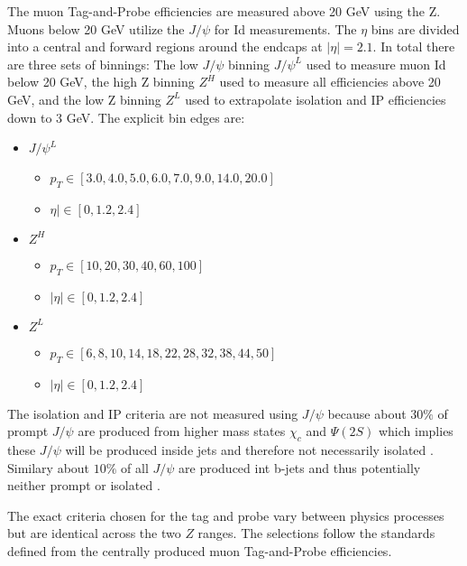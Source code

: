 The muon Tag-and-Probe efficiencies are measured above 20 GeV using the Z. Muons below 20 GeV utilize the $J/\psi$ for Id measurements. The $\eta$ bins are divided into a central and forward regions around the endcaps at $|\eta| = 2.1$. In total there are three sets of binnings: The low \pt $J/\psi$ binning $J/\psi^{L}$ used to measure muon Id below 20 GeV, the high \pt Z binning $Z^{H}$ used to measure all efficiencies above 20 GeV, and the low \pt Z binning $Z^{L}$ used to extrapolate isolation and IP efficiencies down to 3 GeV.
The explicit bin edges are:
\begin{itemize}
\item $J/\psi^{L}$  
	\begin{itemize}
		\item[] $p_T \in [3.0, 4.0,  5.0, 6.0, 7.0, 9.0, 14.0,  20.0]$
		\item[]  $\eta| \in [0, 1.2, 2.4]$
	\end{itemize}
\item $Z^{H}$
	\begin{itemize}
		\item[] $ p_T \in [10, 20, 30, 40, 60, 100]$
		\item[] $|\eta| \in [ 0, 1.2, 2.4]$
	\end{itemize}
\item $Z^{L}$
	\begin{itemize}
		\item[] $ p_T \in [6,8,10,14,18,22,28,32,38,44,50]$ 
		\item[] $|\eta| \in [0, 1.2, 2.4]$
	\end{itemize}
\end{itemize}

The isolation and IP criteria are not measured using $J/\psi$ because about $30\%$ of prompt $J/\psi$ are produced from higher mass states $\chi_c$ and $\Psi(2S)$  which implies these $J/\psi$ will be produced inside jets and therefore not necessarily isolated \cite{Lansberg:2006dh}. Similary about $10\%$ of all $J/\psi$ are produced int b-jets and thus potentially neither prompt or isolated \cite{LHCb:2013itw}.

The exact criteria chosen for the tag and probe vary between physics processes but are identical across the two $Z$ ranges. The selections follow the standards defined from the centrally produced muon Tag-and-Probe efficiencies.\\

